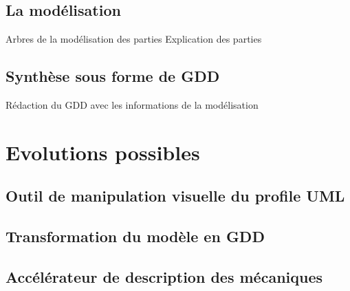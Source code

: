 \subsection{La modélisation}
Arbres de la modélisation des parties
Explication des parties

\subsection{Synthèse sous forme de GDD}
Rédaction du GDD avec les informations de la modélisation

\section{Evolutions possibles}
\subsection{Outil de manipulation visuelle du profile UML}
\subsection{Transformation du modèle en GDD}
\subsection{Accélérateur de description des mécaniques}







